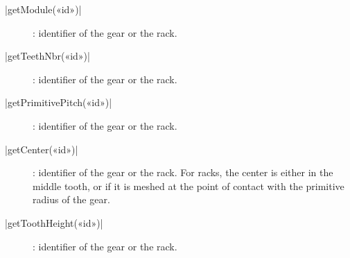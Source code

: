 \documentclass[english]{ltxdoc}
\begin{document}
\begin{colourband}
\commande|getModule(«id»)|\smallskip{}
\begin{description}
  \item[]:  identifier of the gear or the rack. 
\end{description}
\end{colourband}


\begin{colourband}
\commande|getTeethNbr(«id»)|\smallskip{}
\begin{description}
  \item[]:  identifier of the gear or the rack. 
\end{description}
\end{colourband}

\begin{colourband}
\commande|getPrimitivePitch(«id»)|\smallskip{}
\begin{description}
  \item[]:  identifier of the gear or the rack. 
\end{description}
\end{colourband}


\begin{colourband}
\commande|getCenter(«id»)|\smallskip{}
\begin{description}
  \item[]:  identifier of the gear or the rack. For
  racks, the center is either in the middle tooth, or if it is meshed at the
  point of contact with the primitive radius of the gear.
\end{description}
\end{colourband}


\begin{colourband}
\commande|getToothHeight(«id»)|\smallskip{}
\begin{description}
  \item[]:  identifier of the gear or the rack. 
\end{description}
\end{colourband}
\end{document}

